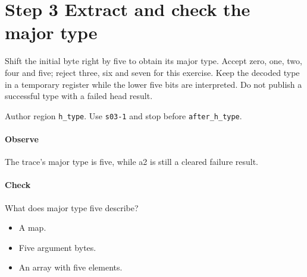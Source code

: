 \section{Step 3 Extract and check the major type}\label{cbor-s03}
Shift the initial byte right by five to obtain its major type. Accept zero, one, two, four and five; reject three, six and seven for this exercise. Keep the decoded type in a temporary register while the lower five bits are interpreted. Do not publish a successful type with a failed head result.

Author region \texttt{h\_type}. Use \texttt{s03-1} and stop before \texttt{after\_h\_type}.

\paragraph{Observe} The trace's major type is five, while a2 is still a cleared failure result.

\paragraph{Check} What does major type five describe?
\begin{itemize}
  \item[A.] A map.
  \item[B.] Five argument bytes.
  \item[C.] An array with five elements.
\end{itemize}
